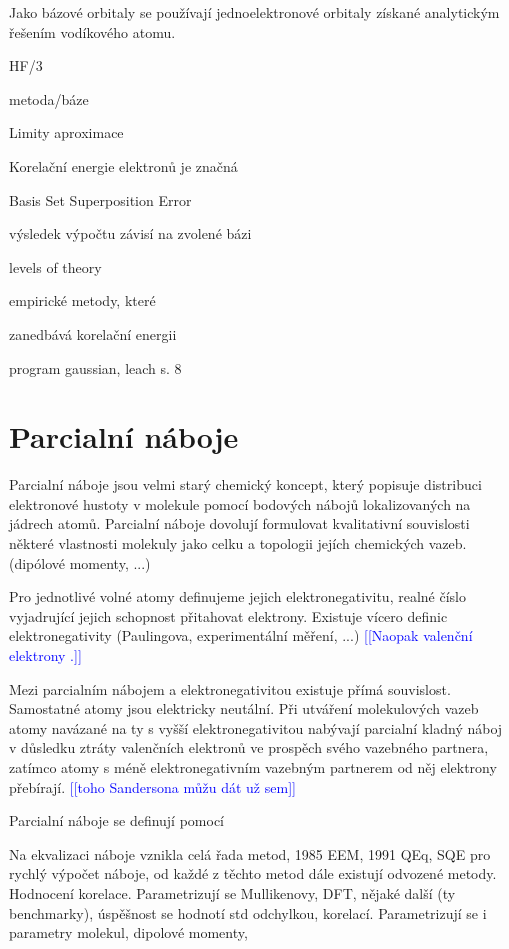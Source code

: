 \documentclass[10pt,draft,oneside]{fithesis2}
\newcommand\todo[1]{\textcolor{blue}{[[#1]]}}
\begin{document}
Jako bázové orbitaly se používají jednoelektronové orbitaly získané analytickým řešením vodíkového atomu.

HF/3

metoda/báze

Limity aproximace

Korelační energie elektronů je značná

Basis Set Superposition Error

výsledek výpočtu závisí na zvolené bázi

levels of theory

empirické metody, které 

zanedbává korelační energii

program gaussian, leach s. 8


\chapter{Parcialní náboje}

Parcialní náboje jsou velmi starý chemický koncept, který popisuje distribuci elektronové hustoty v molekule pomocí bodových nábojů lokalizovaných na jádrech atomů. Parcialní náboje dovolují formulovat kvalitativní souvislosti některé vlastnosti molekuly jako celku a topologii jejích chemických vazeb. (dipólové momenty, ...) 

Pro jednotlivé volné atomy definujeme jejich elektronegativitu, realné číslo vyjadrující jejich schopnost přitahovat elektrony. Existuje vícero definic elektronegativity (Paulingova, experimentální měření, ...)  \todo{Naopak valenční elektrony .}

Mezi parcialním nábojem a elektronegativitou existuje přímá souvislost. Samostatné atomy jsou elektricky neutální. Při utváření molekulových vazeb atomy navázané na ty s vyšší elektronegativitou nabývají parcialní kladný náboj v důsledku ztráty valenčních elektronů ve prospěch svého vazebného partnera, zatímco atomy s méně elektronegativním vazebným partnerem od něj elektrony přebírají. \todo{toho Sandersona můžu dát už sem}

Parcialní náboje se definují pomocí

Na ekvalizaci náboje vznikla celá řada metod, 1985 EEM, 1991 QEq, SQE pro rychlý výpočet náboje, od každé z těchto metod dále existují odvozené metody. Hodnocení korelace. Parametrizují se Mullikenovy, DFT, nějaké další (ty benchmarky), úspěšnost se hodnotí std odchylkou, korelací. Parametrizují se i parametry molekul, dipolové momenty, 
\end{document}
